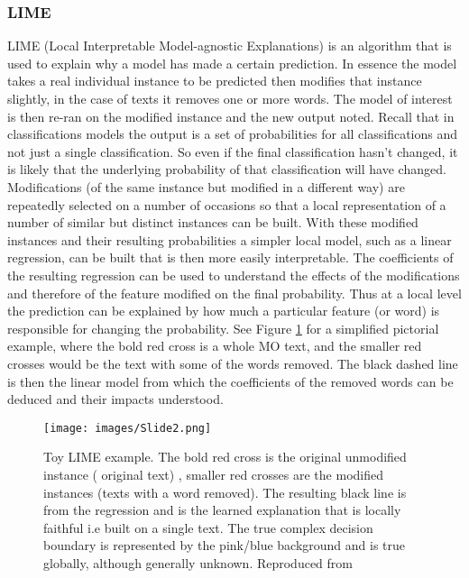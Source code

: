 \subsubsection{LIME} LIME (Local Interpretable Model-agnostic Explanations) \parencite{ribeiro2016should} is an algorithm that is used to explain why a model has made a certain prediction. In essence the model takes a real individual instance to be predicted then modifies that instance slightly, in the case of texts it removes one or more words. The model of interest is then re-ran on the modified instance and the new output noted. Recall that in classifications models the output is a set of probabilities for all classifications and not just a single classification. So even if the final classification hasn't changed, it is likely that the underlying probability of that classification will have changed. Modifications (of the same instance but modified in a different way) are repeatedly selected on a number of occasions so that a local representation of a number of similar but distinct instances can be built. With these modified instances and their resulting probabilities a simpler local model, such as a linear regression, can be built that is then more easily interpretable. The coefficients of the resulting regression can be used to understand the effects of the modifications and therefore of the feature modified on the final probability. Thus at a local level the prediction can be explained by how much a particular feature (or word) is responsible for changing the probability. See Figure \ref{fig:LIME} for a simplified pictorial example, where the bold red cross is a whole MO text, and the smaller red crosses would be the text with some of the words removed. The black dashed line is then the linear model from which the coefficients of the removed words can be deduced and their impacts understood.
\begin{figure}[!tbp]
  \centering
    \texttt{[image: images/Slide2.png]}
    \caption[Toy LIME example.]{ Toy LIME example. The bold red cross is the original unmodified instance ( original text) , smaller red crosses are the modified instances (texts with a word removed). The resulting black line is from the regression and is the learned explanation that is locally faithful i.e built on a single text. The true complex decision boundary is represented by the pink/blue background and is true globally, although generally unknown. Reproduced from \parencite{ribeiro2016should} }
    \label{fig:LIME}
\end{figure}


